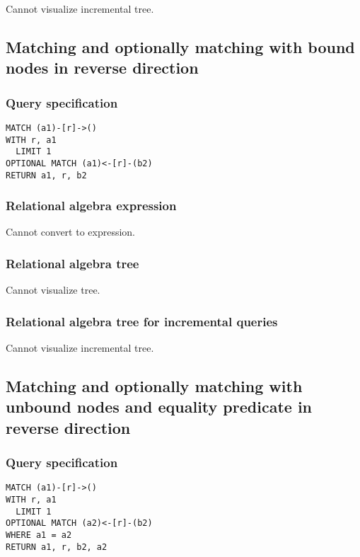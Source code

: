 Cannot visualize incremental tree.

\subsection{Matching and optionally matching with bound nodes in reverse direction}

\subsubsection*{Query specification}

\begin{lstlisting}
MATCH (a1)-[r]->()
WITH r, a1
  LIMIT 1
OPTIONAL MATCH (a1)<-[r]-(b2)
RETURN a1, r, b2
\end{lstlisting}

\subsubsection*{Relational algebra expression}

Cannot convert to expression.

\subsubsection*{Relational algebra tree}

Cannot visualize tree.

\subsubsection*{Relational algebra tree for incremental queries}

Cannot visualize incremental tree.

\subsection{Matching and optionally matching with unbound nodes and equality predicate in reverse direction}

\subsubsection*{Query specification}

\begin{lstlisting}
MATCH (a1)-[r]->()
WITH r, a1
  LIMIT 1
OPTIONAL MATCH (a2)<-[r]-(b2)
WHERE a1 = a2
RETURN a1, r, b2, a2
\end{lstlisting}


